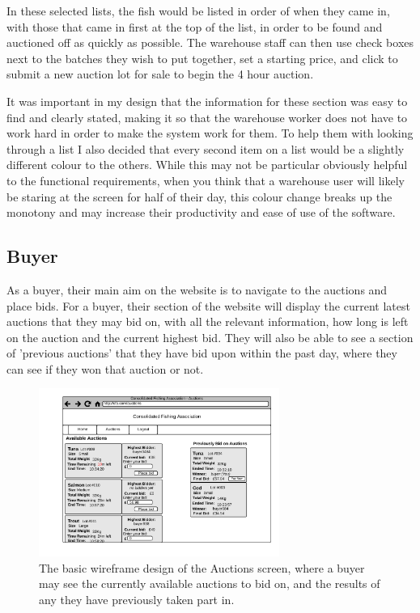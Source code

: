 \documentclass{article}
\begin{document}
In these selected lists, the fish would be listed in order of when they came in, with those that came in first at the top of the list, in order to be found and auctioned off as quickly as possible. The warehouse staff can then use check boxes next to the batches they wish to put together, set a starting price, and click to submit a new auction lot for sale to begin the 4 hour auction.

It was important in my design that the information for these section was easy to find and clearly stated, making it so that the warehouse worker does not have to work hard in order to make the system work for them. To help them with looking through a list I also decided that every second item on a list would be a slightly different colour to the others. While this may not be particular obviously helpful to the functional requirements, when you think that a warehouse user will likely be staring at the screen for half of their day, this colour change breaks up the monotony and may increase their productivity and ease of use of the software.

\subsection{Buyer}

As a buyer, their main aim on the website is to navigate to the auctions and place bids. For a buyer, their section of the website will display the current latest auctions that they may bid on, with all the relevant information, how long is left on the auction and the current highest bid. They will also be able to see a section of 'previous auctions' that they have bid upon within the past day, where they can see if they won that auction or not.

\begin{figure}[H]
	\centering
	\includegraphics[width=0.7\textwidth]{img/wf4.png}
	\caption{The basic wireframe design of the Auctions screen, where a buyer may see the currently available auctions to bid on, and the results of any they have previously taken part in.}
\end{figure}
\end{document}
